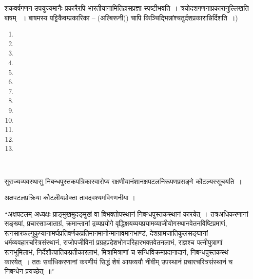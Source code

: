 \vskip 3pt

शकवर्षगणन उपयुज्यमानैः प्रकारैरपि भारतीयानामितिहासप्रज्ञा स्पष्टीभवति~। त्रयोदशगणनाप्रकारानुल्लिखति बाषम् ~। बाषमस्य पट्टिकैवम्प्रकारिका – (अल्बिरूनी() चापि किञ्चिद्भिन्नांश्चतुर्दशप्रकारान्निर्दिशति~।)

\begin{enumerate}[topsep=1pt]
\itemsep=0pt
\item {}
 
 \item {}

 \item {}

 \item {}

 \item {}

 \item {}

 \item {}

 \item {}

 \item {}

 \item {}

 \item {}

 \item {}

 \item {}
\end{enumerate}


~\hfill {}

सुराज्यव्यवस्थासु निबन्धपुस्तकपत्रिकास्वारोप्य रक्षणीयानंशानक्षपटलनिरूपणप्रसङ्गे कौटल्यस्सूचयति~।

अक्षपटलप्रक्रिया कौटलीयप्रोक्ता तावदवश्यमविगणनीया ।

“अक्षपटलम् अध्यक्षः प्राङ्मुखमुदङ्मुखं वा विभक्तोपस्थानं निबन्धपुस्तकस्थानं कारयेत्~। तत्र\break अधिकरणानां सङ्ख्यां, प्रचारसञ्जाताग्रं, क्रमान्तानां द्रव्यप्रयोगे वृद्धिक्षयव्ययप्रयामव्याजीयोगस्थानवेतनविष्टिप्रमाणं, रत्नसारफल्गुकुप्यानामर्घप्रतिवर्णकप्रतिमानमानोन्मानावमानभाण्डं, देशग्रामजातिकुलसङ्घानां धर्मव्यवहारचरित्रसंस्थानं, राजोपजीविनां प्रग्रहप्रदेशभोगपरिहारभक्तवेतनलाभं, राज्ञश्च पत्नीपुत्राणां रत्नभूमिलाभं, निर्देशौत्पातिकप्रतीकारलाभं, मित्रामित्राणां च सन्धिविक्रमप्रदानादानं, निबन्धपुस्तकस्थं कारयेत्~। ततः सर्वाधिकरणानां करणीयं सिद्धं शेषं आयव्ययौ नीवीम् उपस्थानं प्रचारचरित्रसंस्थानं च निबन्धेन प्रयच्छेत्~॥” 


